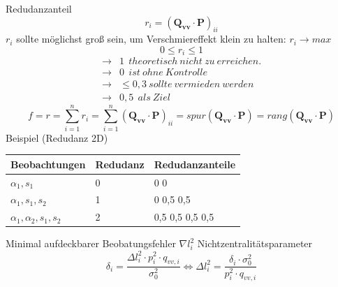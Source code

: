 \documentclass[12pt]{article}
\begin{document}
Redudanzanteil
\begin{equation*}
r_i = (\bm{Q_{vv}} \cdot \bm{P})_{ii}
\end{equation*}
$r_i$ sollte möglichst groß sein, um Verschmiereffekt klein zu halten: $r_i \rightarrow max$
\begin{equation*}
0 \leq r_i \leq 1 
\end{equation*}
\begin{align*}
\rightarrow & 1 \ \ theoretisch\  nicht\  zu\  erreichen.\\
\rightarrow &0\ \ ist\  ohne\  Kontrolle\\
\rightarrow &\leq 0,3 \ sollte\  vermieden\  werden \\
\rightarrow &0,5 \ \ als\ Ziel
\end{align*}
\begin{equation*}
f = r = \sum_{i = 1}^{n} r_i = \sum_{i = 1}^{n} (\bm{Q_{vv}} \cdot \bm{P})_{ii} = spur(\bm{Q_{vv}} \cdot \bm{P}) = rang(\bm{Q_{vv}} \cdot \bm{P})
\end{equation*}
Beispiel (Redudanz 2D)
\begin{figure}[ht]\centering
\end{figure}
\begin{table}[ht]\centering
	\begin{tabular}{|l|l|l|}
		\hline
	Beobachtungen & Redudanz     &   Redudanzanteile      \\ \hline
		$\alpha_1,s_1$      & 0  & 0   0   \\ \hline
		$\alpha_1, s_1, s_2$     & 1  & 0   0,5   0,5  \\ \hline
		$\alpha_1, \alpha_2, s_1, s_2$      & 2  & 0,5   0,5   0,5   0,5   \\ \hline
	\end{tabular}
\end{table}
\newline
Minimal aufdeckbarer Beobatungsfehler $\nabla l_i^2$ \newline
Nichtzentralitätsparameter
\begin{equation*}
\delta_i = \frac{\Delta l_i^2 \cdot p_i^2 \cdot q_{vv,i}}{\sigma_0^2} \Leftrightarrow \Delta l_i^2 = \frac{\delta_i \cdot \sigma_0^2}{p_i^2 \cdot q_{vv,i}}
\end{equation*}
\end{document}
